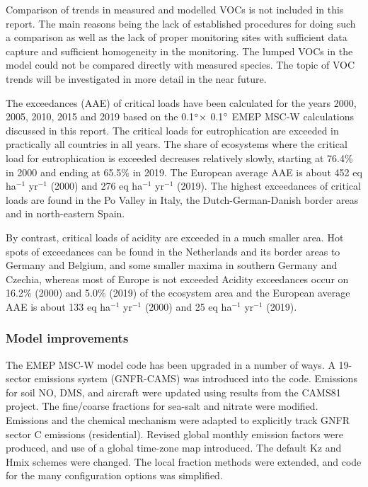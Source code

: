 Comparison of trends in measured and modelled VOCs is not included in this report. The main reasons being the lack of established procedures for doing such a comparison as well as the lack of proper monitoring sites with sufficient data capture and sufficient homogeneity in the monitoring. The lumped VOCs in the model could not be compared directly with measured species. The topic of VOC trends will be investigated in more detail in the near future.  



The exceedances (AAE) of critical loads have been calculated for the years 2000, 2005, 2010, 2015 and 2019 based on the 0.1$^\circ \times$ 0.1$^\circ$ EMEP MSC-W calculations discussed in this report. The critical loads for eutrophication are exceeded in practically all countries in all years. The share of ecosystems where the critical load for eutrophication is exceeded decreases relatively slowly, starting at 76.4\% in 2000 and ending at 65.5\% in 2019. The European average AAE is about 452 eq ha$^{-1}$ yr$^{-1}$ (2000) and 276 eq
ha$^{-1}$ yr$^{-1}$ (2019). The highest exceedances of critical loads are found in the Po Valley in Italy, the
Dutch-German-Danish border areas and in north-eastern Spain.

By contrast, critical loads of acidity are exceeded in a much smaller area. Hot spots of
exceedances can be found in the Netherlands and its border areas to Germany and
Belgium, and some smaller maxima in southern Germany and Czechia, whereas most of Europe is not exceeded
Acidity exceedances occur
on 16.2\% (2000) and 5.0\% (2019) of the ecosystem area and the European average
AAE is about 133 eq ha$^{-1}$ yr$^{-1}$ (2000) and 25 eq ha$^{-1}$ yr$^{-1}$ (2019).









\subsubsection*{Model improvements} %

The EMEP MSC-W model code has been upgraded in a number of ways. 
A 19-sector emissions system (GNFR-CAMS) was introduced into the code. Emissions for soil NO, DMS, and aircraft were updated using results from the CAMS81 project. 
The  fine/coarse fractions for sea-salt and nitrate were modified. Emissions and the chemical mechanism were adapted to explicitly track GNFR sector C emissions (residential). Revised global monthly emission factors were produced, and use of a global time-zone map introduced. The default Kz and Hmix schemes were changed. The local fraction methods were extended, and code for the many configuration options was simplified. 




